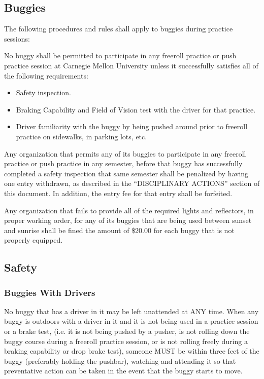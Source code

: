 \subsection{Buggies}

	The following procedures and rules shall apply to buggies during practice
	sessions:
	\newline

	\noindent No buggy shall be permitted to participate in any freeroll practice or push
	practice session at Carnegie Mellon University unless it successfully satisfies all of the	following requirements:

	\begin{itemize}

		\item Safety inspection.

		\item Braking Capability and Field of Vision test with the driver for that practice.

		\item Driver familiarity with the buggy by being pushed around prior to freeroll practice on sidewalks, in parking lots, etc.

	\end{itemize}

	Any organization that permits any of its buggies to participate in any freeroll
	practice or push practice in any semester, before that buggy has successfully
	completed a safety inspection that same semester shall be penalized by having
	one entry withdrawn, as described in the ``DISCIPLINARY ACTIONS'' section of
	this document. In addition, the entry fee for that entry shall be forfeited.

	Any organization that fails to provide all of the required lights and
	reflectors, in proper working order, for any of its buggies that are being used
	between sunset and sunrise shall be fined the amount of \$20.00 for each buggy
	that is not properly equipped.

\subsection{Safety}

\subsubsection{Buggies With Drivers}

	No buggy that has a driver in it may be left unattended at ANY time. When any
	buggy is outdoors with a driver in it and it is not being used in a practice
	session or a brake test, (i.e. it is not being pushed by a pusher, is not
	rolling down the buggy course during a freeroll practice session, or is not
	rolling freely during a braking capability or drop brake test), someone MUST be
	within three feet of the buggy (preferably holding the pushbar), watching and
	attending it so that preventative action can be taken in the event that the
	buggy starts to move.

